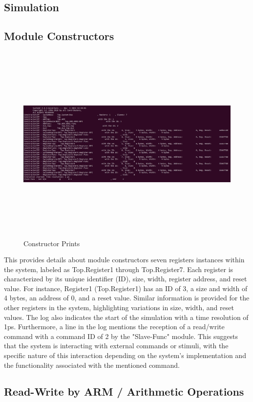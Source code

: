 \documentclass[a4paper,12pt,english]{report}
\begin{document}
\begin{enumerate}
\chapter{Simulation}
\section{Module Constructors}
\begin{figure}[h!]
\centering
\includegraphics[width=16cm, height=10cm]{Constructor.jpg}
\caption{Constructor Prints}
\end{figure}

This provides details about module constructors seven registers instances within the system, labeled as Top.Register1 through Top.Register7. Each register is characterized by its unique identifier (ID), size, width, register address, and reset value. For instance, Register1 (Top.Register1) has an ID of 3, a size and width of 4 bytes, an address of 0, and a reset value. Similar information is provided for the other registers in the system, highlighting variations in size, width, and reset values. The log also indicates the start of the simulation with a time resolution of 1ps. Furthermore, a line in the log mentions the reception of a read/write command with a command ID of 2 by the "Slave-Func" module. This suggests that the system is interacting with external commands or stimuli, with the specific nature of this interaction depending on the system's implementation and the functionality associated with the mentioned command.

\section{Read-Write by ARM / Arithmetic Operations}

\end{enumerate}
\end{document}
